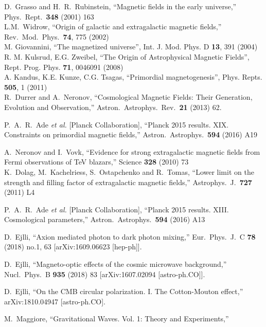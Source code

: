 \documentclass[a4paper,11pt]{article}
\begin{document}
\begin{thebibliography}{99}
  D.~Grasso and H.~R.~Rubinstein,
  ``Magnetic fields in the early universe,''
  Phys.\ Rept.\  {\bf 348} (2001) 163\\
L.M.~Widrow,
  ``Origin of galactic and extragalactic magnetic fields,''
  Rev.\ Mod.\ Phys.\  {\bf 74}, 775 (2002) \\
M. Giovannini, ``The magnetized universe'', 
Int. J. Mod. Phys. D {\bf 13}, 391  (2004)\\
R. M. Kulsrud, E.G. Zweibel, 
``The Origin of Astrophysical Magnetic Fields'', 
Rept. Prog. Phys. {\bf 71}, 0046091 (2008) \\ 
A. Kandus, K.E. Kunze, C.G. Tsagas, 
``Primordial magnetogenesis'', 
Phys. Repts. {\bf 505}, 1 (2011) \\
R.~Durrer and A.~Neronov,
  ``Cosmological Magnetic Fields: Their Generation, Evolution and Observation,''
  Astron.\ Astrophys.\ Rev.\  {\bf 21} (2013) 62.
  
  
  
  
  P.~A.~R.~Ade {\it et al.} [Planck Collaboration],
  ``Planck 2015 results. XIX. Constraints on primordial magnetic fields,''
  Astron.\ Astrophys.\  {\bf 594} (2016) A19  
  
  
  A.~Neronov and I.~Vovk,
  ``Evidence for strong extragalactic magnetic fields from Fermi observations of TeV blazars,''
  Science {\bf 328} (2010) 73\\ 
K.~Dolag, M.~Kachelriess, S.~Ostapchenko and R.~Tomas,
  ``Lower limit on the strength and filling factor of extragalactic magnetic fields,''
  Astrophys.\ J.\  {\bf 727} (2011) L4  
  
  
    


  P.~A.~R.~Ade {\it et al.} [Planck Collaboration],
  ``Planck 2015 results. XIII. Cosmological parameters,''
  Astron.\ Astrophys.\  {\bf 594} (2016) A13  




  D.~Ejlli,
  ``Axion mediated photon to dark photon mixing,''
  Eur.\ Phys.\ J.\ C {\bf 78} (2018) no.1,  63
  [arXiv:1609.06623 [hep-ph]].
 
 
  D.~Ejlli,
  ``Magneto-optic effects of the cosmic microwave background,''
  Nucl.\ Phys.\ B {\bf 935} (2018) 83
  [arXiv:1607.02094 [astro-ph.CO]].
  
  
   
  D.~Ejlli,
  ``On the CMB circular polarization. I. The Cotton-Mouton effect,''
  arXiv:1810.04947 [astro-ph.CO].   
  
  M.~Maggiore,
  ``Gravitational Waves. Vol. 1: Theory and Experiments,''  
  
  
  
  
  
  
   \end{thebibliography}
  
\end{document}
